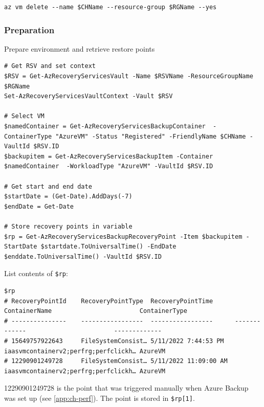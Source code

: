 \begin{verbatim}
az vm delete --name $CHName --resource-group $RGName --yes
\end{verbatim}

\subsubsection{Preparation}
\label{sec:orgd393ff5}
Prepare environment and retrieve restore points
\begin{verbatim}
# Get RSV and set context
$RSV = Get-AzRecoveryServicesVault -Name $RSVName -ResourceGroupName $RGName
Set-AzRecoveryServicesVaultContext -Vault $RSV

# Select VM
$namedContainer = Get-AzRecoveryServicesBackupContainer  -ContainerType "AzureVM" -Status "Registered" -FriendlyName $CHName -VaultId $RSV.ID
$backupitem = Get-AzRecoveryServicesBackupItem -Container $namedContainer  -WorkloadType "AzureVM" -VaultId $RSV.ID

# Get start and end date
$startDate = (Get-Date).AddDays(-7)
$endDate = Get-Date

# Store recovery points in variable
$rp = Get-AzRecoveryServicesBackupRecoveryPoint -Item $backupitem -StartDate $startdate.ToUniversalTime() -EndDate $enddate.ToUniversalTime() -VaultId $RSV.ID
\end{verbatim}

List contents of \texttt{\$rp}:
\begin{verbatim}
$rp
# RecoveryPointId    RecoveryPointType  RecoveryPointTime      ContainerName                        ContainerType
# ---------------    -----------------  -----------------      -------------                        -------------
# 15649757922643     FileSystemConsist… 5/11/2022 7:44:53 PM   iaasvmcontainerv2;perfrg;perfclickh… AzureVM
# 12290901249728     FileSystemConsist… 5/11/2022 11:09:00 AM  iaasvmcontainerv2;perfrg;perfclickh… AzureVM
\end{verbatim}

12290901249728 is the point that was triggered manually when Azure Backup was set up (see \ref{app:ch-perf}).
The point is stored in \texttt{\$rp[1]}.

